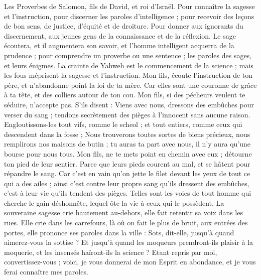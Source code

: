 \begin{multicols}{2}
\VerseOne{}Les Proverbes de Salomon, fils de David, et roi d'Israël.
Pour connaître la sagesse et l'instruction, pour discerner les paroles d'intelligence ;
pour recevoir des leçons de bon sens, de justice, d’équité et de droiture.
Pour donner aux ignorants du discernement, aux jeunes gens de la connaissance et de la réflexion.
Le sage écoutera, et il augmentera son savoir, et l'homme intelligent acquerra de la prudence ;
pour comprendre un proverbe ou une sentence ; les paroles des sages, et leurs énigmes.
La crainte de Yahweh est le commencement de la science ; mais les fous méprisent la sagesse et l'instruction.
Mon fils, écoute l'instruction de ton père, et n'abandonne point la loi de ta mère.
Car elles sont une couronne de grâce à ta tête, et des colliers autour de ton cou.
Mon fils, si des pécheurs veulent te séduire, n’accepte pas.
S'ils disent : Viens avec nous, dressons des embûches pour verser du sang ; tendons secrètement des pièges à l’innocent sans aucune raison.
Engloutissons-les tout vifs, comme le scheol ; et tout entiers, comme ceux qui descendent dans la fosse ;
Nous trouverons toutes sortes de biens précieux, nous remplirons nos maisons de butin ;
tu auras ta part avec nous, il n'y aura qu'une bourse pour nous tous.
Mon fils, ne te mets point en chemin avec eux ; détourne ton pied de leur sentier.
Parce que leurs pieds courent au mal, et se hâtent pour répandre le sang.
Car c’est en vain qu’on jette le filet devant les yeux de tout ce qui a des ailes ;
ainsi c’est contre leur propre sang qu’ils dressent des embûches, c’est à leur vie qu’ils tendent des pièges.
Telles sont les voies de tout homme qui cherche le gain déshonnête, lequel ôte la vie à ceux qui le possèdent.
La souveraine sagesse crie hautement au-dehors, elle fait retentir sa voix dans les rues.
Elle crie dans les carrefours, là où on fait le plus de bruit, aux entrées des portes, elle prononce ses paroles dans la ville :
Sots, dit-elle, jusqu'à quand aimerez-vous la sottise ? Et jusqu'à quand les moqueurs prendront-ils plaisir à la moquerie, et les insensés haïront-ils la science ?
Etant repris par moi, convertissez-vous ; voici, je vous donnerai de mon Esprit en abondance, et je vous ferai connaître mes paroles.

\end{multicols}
